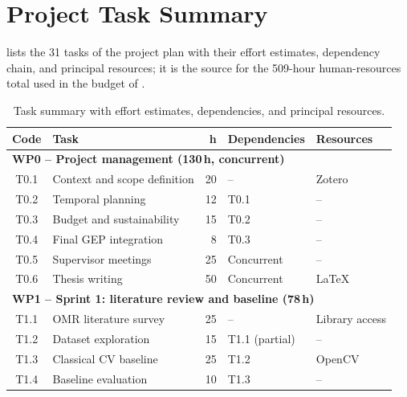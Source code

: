 \section{Project Task Summary}
\label{app:task-summary}

 lists the 31 tasks of the project plan
with their effort estimates, dependency chain, and principal
resources; it is the source for the 509-hour human-resources total
used in the budget of .

\begin{table}[H]
    \centering
    \caption{Task summary with effort estimates, dependencies, and
    principal resources.}
    \label{tab:task-summary}
    \renewcommand{\arraystretch}{1.05}
    \scriptsize
    \begin{tabularx}{\linewidth}{c >{\raggedright}p{4.2cm} r >{\raggedright\arraybackslash}p{2.2cm} >{\raggedright\arraybackslash}p{2.0cm}}
        \toprule
        \textbf{Code} & \textbf{Task} & \textbf{h} & \textbf{Dependencies} & \textbf{Resources} \\
        \midrule
        \multicolumn{5}{l}{\textbf{WP0 -- Project management (130\,h, concurrent)}} \\
        \midrule
        T0.1 & Context and scope definition         & 20  & --             & Zotero \\
        T0.2 & Temporal planning                    & 12  & T0.1           & -- \\
        T0.3 & Budget and sustainability            & 15  & T0.2           & -- \\
        T0.4 & Final GEP integration                & 8   & T0.3           & -- \\
        T0.5 & Supervisor meetings                  & 25  & Concurrent     & -- \\
        T0.6 & Thesis writing                       & 50  & Concurrent     & \LaTeX{} \\
        \midrule
        \multicolumn{5}{l}{\textbf{WP1 -- Sprint 1: literature review and baseline (78\,h)}} \\
        \midrule
        T1.1 & OMR literature survey                & 25  & --             & Library access \\
        T1.2 & Dataset exploration                  & 15  & T1.1 (partial) & -- \\
        T1.3 & Classical CV baseline                & 25  & T1.2           & OpenCV \\
        T1.4 & Baseline evaluation                  & 10  & T1.3           & -- \\

\end{tabularx}
\end{table}
